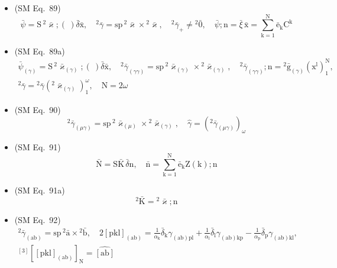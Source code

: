 \documentclass[12pt]{article}
\begin{document}
\begin{itemize}[label={},leftmargin=0pt]
    \item (SM Eq.\ 89) 
    \[
    \bar{\psi} = \mathrm{S}\,{}^2\bar{\varkappa};(\ )\bar{\delta}\bar{\mathrm{x}}, \quad {}^2\bar{\gamma} = \mathrm{sp}\,{}^2\bar{\varkappa} \times {}^2\bar{\varkappa}, \quad {}^2\bar{\gamma}_+ \ne {}^2\bar{0}, \quad \bar{\psi};\mathrm{n} = \bar{\xi}\,\bar{\mathrm{x}} = \sum_{\mathrm{k}=1}^\mathrm{N} \bar{\mathrm{e}}_\mathrm{k} \mathrm{C^k}
    \]

    \item (SM Eq.\ 89a) 
    \[
    \begin{gathered}
    \bar{\psi}_{(\gamma)} = \mathrm{S}\,{}^2\bar{\varkappa}_{(\gamma)};(\ )\bar{\delta}\bar{\mathrm{x}}, \quad {}^2\bar{\gamma}_{(\gamma\gamma)} = \mathrm{sp}\,{}^2\bar{\varkappa}_{(\gamma)} \times {}^2\bar{\varkappa}_{(\gamma)}, \quad {}^2\bar{\gamma}_{(\gamma\gamma)};\mathrm{n} = {}^2\bar{\mathrm{g}}_{(\gamma)} \left( \mathrm{x^l} \right)_1^\mathrm{N}, \\
    {}^2\bar{\gamma} = {}^2\bar{\gamma}\left({}^2\bar{\varkappa}_{(\gamma)}\right)_1^\omega, \quad \mathrm{N} = 2\omega
    \end{gathered}
    \]

    \item (SM Eq.\ 90) 
    \[
    {}^2\bar{\gamma}_{(\mu\gamma)} = \mathrm{sp}\,{}^2\bar{\varkappa}_{(\mu)} \times {}^2\bar{\varkappa}_{(\gamma)}, \quad \hat{\gamma} = \left( {}^2\bar{\gamma}_{(\mu\gamma)} \right)_\omega
    \]

    \item (SM Eq.\ 91) 
    \[
    \bar{\mathrm{N}} = \mathrm{S}\bar{\mathrm{K}}\,\bar{\delta}\mathrm{n}, \quad \bar{\mathrm{n}} = \sum_{\mathrm{k}=1}^\mathrm{N} \bar{\mathrm{e}}_\mathrm{k} \mathrm{Z}(\mathrm{k});\mathrm{n}
    \]

    \item (SM Eq.\ 91a) 
    \[
    {}^2\bar{\mathrm{K}} = {}^2\bar{\varkappa};\mathrm{n}
    \]

    \item (SM Eq.\ 92) 
    \[
    \begin{gathered}
    {}^2\bar{\gamma}_{(\mathrm{ab})} = \mathrm{sp}\,{}^2\bar{\mathrm{a}} \times {}^2\bar{\mathrm{b}}, \quad 2\left[\mathrm{pkl}\right]_{(\mathrm{ab})} = \frac{1}{\alpha_\mathrm{k}}\bar{\delta}_\mathrm{k} \gamma_{(\mathrm{ab})\mathrm{pl}} + \frac{1}{\alpha_\mathrm{l}}\bar{\delta}_\mathrm{l} \gamma_{(\mathrm{ab})\mathrm{kp}} - \frac{1}{\alpha_\mathrm{p}}\bar{\delta}_\mathrm{p} \gamma_{(\mathrm{ab})\mathrm{kl}}, \\
    {}^{[3]}\left[ \left[ \mathrm{pkl} \right]_{(\mathrm{ab})} \right]_\mathrm{N} = \widehat{\left[ \mathrm{ab} \right]}
    \end{gathered}
    \]


\end{itemize}
\end{document}
